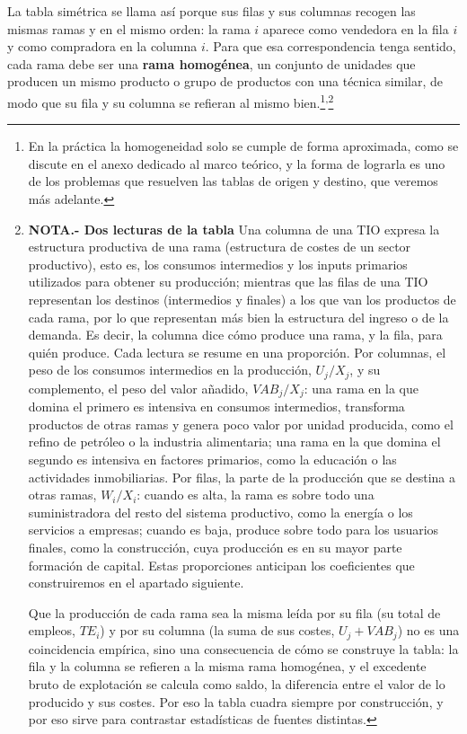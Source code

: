 \documentclass[10pt,a4paper]{article}
\newcounter{anexo}
\begin{document}
La tabla simétrica se llama así porque sus filas y sus columnas recogen las mismas ramas y en el mismo orden: la rama $i$ aparece como vendedora en la fila $i$ y como compradora en la columna $i$. Para que esa correspondencia tenga sentido, cada rama debe ser una \textbf{rama homogénea}, un conjunto de unidades que producen un mismo producto o grupo de productos con una técnica similar, de modo que su fila y su columna se refieran al mismo bien.\footnote{%
  En la práctica la homogeneidad solo se cumple de forma aproximada, como se discute en el anexo dedicado al marco teórico, y la forma de lograrla es uno de los problemas que resuelven las tablas de origen y destino, que veremos más adelante.
}\textsuperscript{,}\footnote{%
  \textbf{NOTA.- Dos lecturas de la tabla} Una columna de una TIO expresa la estructura productiva de una rama (estructura de costes de un sector productivo), esto es, los consumos intermedios y los inputs primarios utilizados para obtener su producción; mientras que las filas de una TIO representan los destinos (intermedios y finales) a los que van los productos de cada rama, por lo que representan más bien la estructura del ingreso o de la demanda. Es decir, la columna dice cómo produce una rama, y la fila, para quién produce. Cada lectura se resume en una proporción. Por columnas, el peso de los consumos intermedios en la producción, $U_j/X_j$, y su complemento, el peso del valor añadido, $VAB_j/X_j$: una rama en la que domina el primero es intensiva en consumos intermedios, transforma productos de otras ramas y genera poco valor por unidad producida, como el refino de petróleo o la industria alimentaria; una rama en la que domina el segundo es intensiva en factores primarios, como la educación o las actividades inmobiliarias. Por filas, la parte de la producción que se destina a otras ramas, $W_i/X_i$: cuando es alta, la rama es sobre todo una suministradora del resto del sistema productivo, como la energía o los servicios a empresas; cuando es baja, produce sobre todo para los usuarios finales, como la construcción, cuya producción es en su mayor parte formación de capital. Estas proporciones anticipan los coeficientes que construiremos en el apartado siguiente.

  Que la producción de cada rama sea la misma leída por su fila (su total de empleos, $TE_i$) y por su columna (la suma de sus costes, $U_j+VAB_j$) no es una coincidencia empírica, sino una consecuencia de cómo se construye la tabla: la fila y la columna se refieren a la misma rama homogénea, y el excedente bruto de explotación se calcula como saldo, la diferencia entre el valor de lo producido y sus costes. Por eso la tabla cuadra siempre por construcción, y por eso sirve para contrastar estadísticas de fuentes distintas.
}
\end{document}
